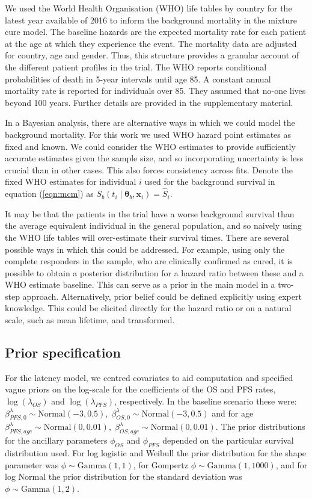 \documentclass[AMA,STIX1COL]{WileyNJD-v2}
\begin{document}
We used the World Health Organisation (WHO) life tables by country for the latest year available of 2016 \cite{wholifetables} to inform the background mortality in the mixture cure model.
The baseline hazards are the expected mortality rate for each patient at the age at which they experience the event.
The mortality data are adjusted for country, age and gender. Thus, this structure provides a granular account of the different patient profiles in the trial.
The WHO reports conditional probabilities of death in 5-year intervals until age 85.
A constant annual mortality rate is reported for individuals over 85. They assumed that no-one lives beyond 100 years.
Further details are provided in the supplementary material.

In a Bayesian analysis, there are alternative ways in which we could model the background mortality.
For this work we used WHO hazard point estimates as fixed and known.
We could consider the WHO estimates to provide sufficiently accurate estimates given the sample size, and so incorporating uncertainty is less crucial than in other cases. This also forces consistency across fits.
Denote the fixed WHO estimates for individual $i$ used for the background survival in equation (\ref{eqn:mcm}) as $S_b(t_i \mid \bm\theta_b, \bm{x}_i) = \hat{S}_i$.

It may be that the patients in the trial have a worse background survival than the average equivalent individual in the general population, and so naively using the WHO life tables will over-estimate their survival times.
There are several possible ways in which this could be addressed.
For example, using only the complete responders in the sample, who are clinically confirmed as cured, it is possible to obtain a posterior distribution for a hazard ratio between these and a WHO estimate baseline.
This can serve as a prior in the main model in a two-step approach. Alternatively, prior belief could be defined explicitly using expert knowledge.
This could be elicited directly for the hazard ratio or on a natural scale, such as mean lifetime, and transformed.

%
\subsection{Prior specification}
For the latency model, we centred covariates to aid computation and specified vague priors on the log-scale for the coefficients of the OS and PFS rates, $\log(\lambda_{OS})$ and $\log(\lambda_{PFS})$, respectively. 
In the baseline scenario these were: ${\beta_{PFS,0}^{\lambda} \sim \text{Normal}(-3, 0.5),}\; {\beta_{OS,0}^{\lambda} \sim \text{Normal}(-3, 0.5)}$ and for age $\beta_{PFS,age}^{\lambda} \sim \text{Normal}(0, 0.01),\; \beta_{OS,age}^{\lambda} \sim \text{Normal}(0, 0.01)$.
The prior distributions for the ancillary parameters $\phi_{OS}$ and $\phi_{PFS}$ depended on the particular survival distribution used. For log logistic and Weibull the prior distribution for the shape parameter was $\phi \sim \text{Gamma}(1,1)$, for Gompertz $\phi \sim \text{Gamma}(1,1000)$, and for log Normal the prior distribution for the standard deviation was $\phi \sim \text{Gamma}(1,2)$.
\end{document}

